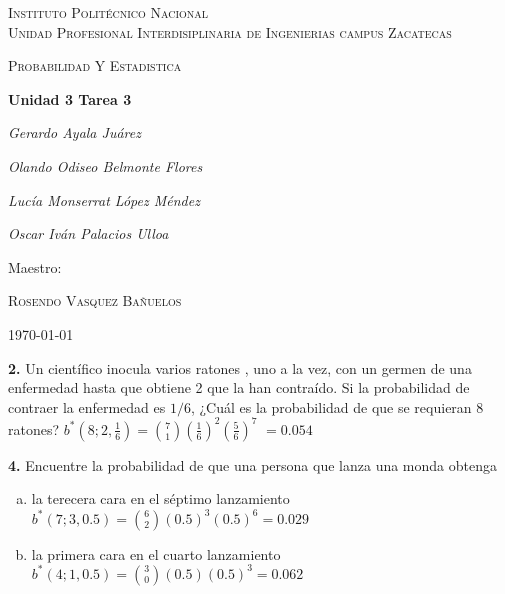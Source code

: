 \documentclass[12pt, letterpaper]{article}
\begin{document}
    \begin{titlepage}
        \centering
        {\scshape\LARGE Instituto Politécnico Nacional\\ Unidad Profesional Interdisiplinaria de Ingenierias campus Zacatecas\par}
        \vspace{1cm}
        {\scshape\Large Probabilidad Y Estadistica\par}
        \vspace{1.5cm}
        {\huge\bfseries Unidad 3 Tarea 3\par}
        \vspace{2cm}
        {\Large\itshape Gerardo Ayala Juárez\par}
        {\Large\itshape Olando Odiseo Belmonte Flores\par}
        {\Large\itshape Lucía Monserrat López Méndez\par}
        {\Large\itshape Oscar Iván Palacios Ulloa\par}
        \vfill
        Maestro:\par
        \textsc{
        Rosendo Vasquez Bañuelos}
        \vfill
        {\large \today \par}
    \end{titlepage}

    \textbf{2. }Un científico inocula varios ratones , uno a la vez, con un germen de una enfermedad hasta que obtiene 2
    que la han contraído. Si la probabilidad  de contraer la enfermedad es $1/6$, ¿Cuál es la probabilidad de que se
    requieran 8 ratones?\vskip0.5cm
    $b^*\left(8;2,\displaystyle\frac{1}{6}\right)=\displaystyle\binom{7}{1}\left(\frac{1}{6}\right)^2\left(\frac{5}{6}\right)^7$
    $=0.054$
    \vskip1cm

    \textbf{4. }Encuentre la probabilidad  de que una persona que lanza una monda obtenga
    \begin{enumerate}[a)]
        \item la terecera cara en el séptimo lanzamiento\\
            $b^*\left(7;3,0.5\right)=\displaystyle\binom{6}{2}\left(0.5\right)^3\left(0.5\right)^6=0.029$
        \item la primera cara en el cuarto lanzamiento\\
            $b^*\left(4;1,0.5\right)=\displaystyle\binom{3}{0}\left(0.5\right)\left(0.5\right)^3=0.062$
    \end{enumerate}\vskip1cm
\end{document}
